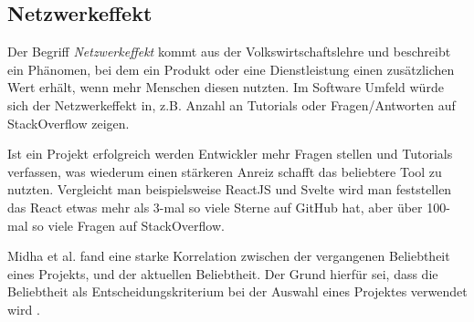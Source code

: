 \subsection{Netzwerkeffekt}


Der Begriff \textit{Netzwerkeffekt} kommt aus der Volkswirtschaftslehre und beschreibt ein Phänomen,
bei dem ein Produkt oder eine Dienstleistung einen zusätzlichen Wert erhält, wenn mehr Menschen
diesen nutzten.
Im Software Umfeld würde sich der Netzwerkeffekt in, z.B. Anzahl an Tutorials
oder Fragen/Antworten auf StackOverflow zeigen.

Ist ein Projekt erfolgreich werden Entwickler mehr Fragen stellen und Tutorials verfassen, 
was wiederum einen stärkeren Anreiz schafft das beliebtere Tool zu nutzten. 
Vergleicht man beispielsweise ReactJS und Svelte wird man feststellen das React etwas mehr als 3-mal 
so viele Sterne auf GitHub hat, aber über 100-mal so viele Fragen auf StackOverflow. 

\begin{table}[h]
\end{table}



Midha et al. fand eine starke Korrelation zwischen der vergangenen Beliebtheit eines Projekts,
und der aktuellen Beliebtheit. Der Grund hierfür sei, dass die Beliebtheit
als Entscheidungskriterium bei der Auswahl eines Projektes verwendet wird
\cite{midhaFactorsAffectingSuccess2012}. %

